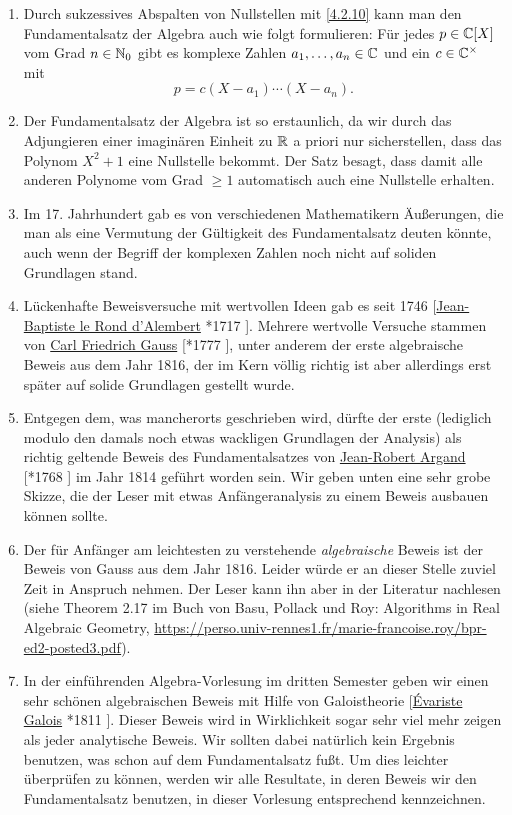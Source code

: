 \documentclass[../../main.tex]{subfiles}
\begin{document}
\begin{bem}\label{4.2.13}
\begin{enumerate}[\normalfont(a)]
\item Durch sukzessives Abspalten von Nullstellen mit \ref{4.2.10} kann man den Fundamentalsatz der Algebra auch wie folgt formulieren:
Für jedes $p\in\mathbb C[X]$ vom Grad $n\in\mathbb N_0$ gibt es komplexe Zahlen $a_1,\dots,a_n\in\mathbb C$ und ein $c\in\mathbb C^\times$ mit
$$p=c(X-a_1)\dotsm(X-a_n).$$
\item Der Fundamentalsatz der Algebra ist so erstaunlich, da wir durch das Adjungieren einer imaginären Einheit zu $\mathbb R$ a priori nur sicherstellen, dass das Polynom
$X^2+1$ eine Nullstelle bekommt. Der Satz besagt, dass damit alle anderen Polynome vom Grad $\ge1$ automatisch auch eine Nullstelle erhalten.
\item Im 17. Jahrhundert gab es von verschiedenen Mathematikern Äußerungen, die man als eine Vermutung der Gültigkeit des Fundamentalsatz deuten könnte, auch wenn der Begriff der komplexen Zahlen noch nicht auf soliden Grundlagen stand.
\item Lückenhafte Beweisversuche mit wertvollen Ideen gab es seit 1746 [\href{http://de.wikipedia.org/wiki/Jean-Baptiste_le_Rond_d’Alembert}{Jean-Baptiste le Rond d'Alembert} *1717 ]. Mehrere wertvolle Versuche stammen von
\href{http://de.wikipedia.org/wiki/Carl_Friedrich_Gauß}{Carl Friedrich Gauss} [*1777 ], unter anderem der erste algebraische Beweis aus dem Jahr 1816, der im Kern völlig richtig ist aber allerdings erst später auf solide Grundlagen gestellt wurde.
\item Entgegen dem, was mancherorts geschrieben wird, dürfte der erste (lediglich modulo den damals noch etwas wackligen Grundlagen der Analysis) als richtig geltende Beweis des Fundamentalsatzes von \href{http://de.wikipedia.org/wiki/Jean-Robert_Argand}{Jean-Robert Argand} [*1768 ] im Jahr 1814 geführt worden sein. Wir geben unten eine sehr grobe Skizze, die der Leser mit etwas Anfängeranalysis zu einem Beweis ausbauen können sollte.
\item Der für Anfänger am leichtesten zu verstehende \emph{algebraische} Beweis ist der Beweis von Gauss aus dem Jahr 1816. Leider würde er an dieser Stelle zuviel Zeit
in Anspruch nehmen. Der Leser kann ihn aber in der Literatur nachlesen
(siehe Theorem 2.17 im Buch von Basu, Pollack und Roy: Algorithms in Real Algebraic Geometry,  \url{https://perso.univ-rennes1.fr/marie-francoise.roy/bpr-ed2-posted3.pdf}).
\item In der einführenden Algebra-Vorlesung im dritten Semester geben wir einen sehr schönen algebraischen Beweis mit Hilfe von Galoistheorie
[\href{http://de.wikipedia.org/wiki/Évariste_Galois}{Évariste Galois} *1811 ]. Dieser Beweis wird in Wirklichkeit sogar sehr viel mehr zeigen als jeder analytische Beweis. Wir sollten
dabei natürlich kein Ergebnis benutzen, was schon auf dem Fundamentalsatz fußt. Um dies leichter überprüfen zu
können, werden wir alle Resultate, in deren Beweis wir den Fundamentalsatz benutzen, in dieser Vorlesung entsprechend kennzeichnen.
\end{enumerate}
\end{bem}
\end{document}
